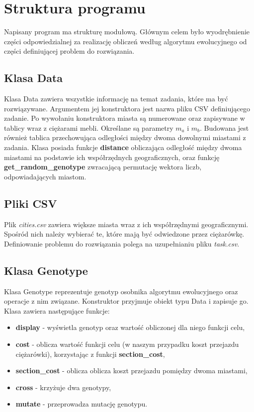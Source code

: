 \documentclass[12pt, oneside, final]{report}
\begin{document}
\section{Struktura programu}
Napisany program ma strukturę modułową. Głównym celem było wyodrębnienie części odpowiedzialnej za realizację obliczeń według algorytmu ewolucyjnego od części definiującej problem do rozwiązania.

\subsection{Klasa Data}
Klasa Data zawiera wszystkie informację na temat zadania, które ma być rozwiązywane. Argumentem jej konstruktora jest nazwa pliku CSV definiującego zadanie. Po wywołaniu konstruktora miasta są numerowane oraz zapisywane w tablicy wraz z ciężarami mebli. Określane są parametry $m_a$ i $m_b$. Budowana jest również tablica przechowująca odległości między dwoma dowolnymi miastami z zadania. Klasa posiada funkcje \textbf{distance} obliczająca odległość między dwoma miastami na podstawie ich współrzędnych geograficznych, oraz funkcję \textbf{get\_random\_genotype} zwracającą permutację wektora liczb, odpowiadających miastom.
\subsection{Pliki CSV}\label{sec:csv}
Plik \textit{cities.csv} zawiera większe miasta wraz z ich współrzędnymi geograficznymi. Spośród nich należy wybierać te, które mają być odwiedzone przez ciężarówkę. Definiowanie problemu do rozwiązania polega na uzupełnianiu pliku \textit{task.csv}.

\subsection{Klasa Genotype}
Klasa Genotype reprezentuje genotyp osobnika algorytmu ewolucyjnego oraz operacje z nim związane. Konstruktor przyjmuje obiekt typu Data i zapisuje go. Klasa zawiera następujące funkcje:
\begin{itemize}
\item \textbf{display} - wyświetla genotyp oraz wartość obliczonej dla niego funkcji celu,
\item \textbf{cost} - oblicza wartość funkcji celu (w naszym przypadku koszt przejazdu ciężarówki), korzystając z funkcji \textbf{section\_cost},
\item \textbf{section\_cost} - oblicza oblicza koszt przejazdu pomiędzy dwoma miastami,
\item \textbf{cross} - krzyżuje dwa genotypy,
\item \textbf{mutate} - przeprowadza mutację genotypu.
\end{itemize}
\end{document}
